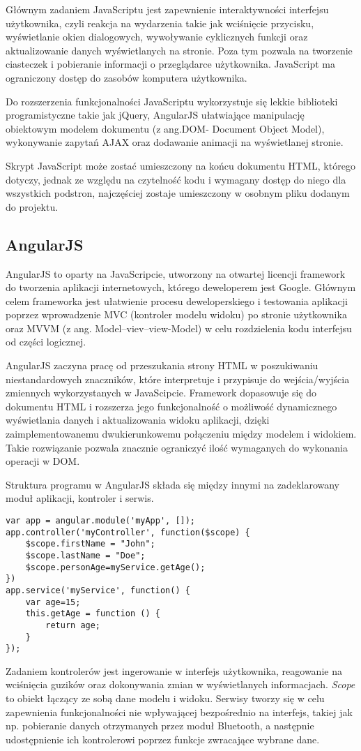 Głównym zadaniem JavaScriptu jest zapewnienie interaktywności interfejsu użytkownika, czyli reakcja na wydarzenia takie jak wciśnięcie przycisku, wyświetlanie okien dialogowych, wywoływanie cyklicznych funkcji oraz aktualizowanie danych wyświetlanych na stronie. Poza tym pozwala na tworzenie ciasteczek i pobieranie informacji o przeglądarce użytkownika. JavaScript ma ograniczony dostęp do zasobów komputera użytkownika.

Do rozszerzenia funkcjonalności JavaScriptu wykorzystuje się lekkie biblioteki programistyczne takie jak jQuery, AngularJS ułatwiające manipulację obiektowym modelem dokumentu (z ang.DOM- Document Object Model), wykonywanie zapytań AJAX oraz dodawanie animacji na wyświetlanej stronie.

Skrypt JavaScript może zostać umieszczony na końcu dokumentu HTML, którego dotyczy, jednak ze względu na czytelność kodu i wymagany dostęp do niego dla wszystkich podstron, najczęściej zostaje umieszczony w osobnym pliku dodanym do projektu.

\subsection{AngularJS}%
AngularJS to oparty na JavaScripcie, utworzony na otwartej licencji framework do tworzenia aplikacji internetowych, którego deweloperem jest Google. Głównym celem frameworka jest ułatwienie procesu deweloperskiego i testowania aplikacji poprzez wprowadzenie MVC (kontroler modelu widoku) po stronie użytkownika oraz MVVM (z ang. Model--viev--view-Model) w celu rozdzielenia kodu interfejsu od części logicznej.

AngularJS zaczyna pracę od przeszukania strony HTML w poszukiwaniu niestandardowych znaczników, które interpretuje i przypisuje do wejścia/wyjścia zmiennych wykorzystanych w JavaScipcie. Framework dopasowuje się do dokumentu HTML i rozszerza jego funkcjonalność o możliwość dynamicznego wyświetlania danych i aktualizowania widoku aplikacji, dzięki zaimplementowanemu dwukierunkowemu połączeniu między modelem i widokiem. Takie rozwiązanie pozwala znacznie ograniczyć ilość wymaganych do wykonania operacji w DOM.

Struktura programu w AngularJS składa się między innymi na zadeklarowany moduł aplikacji, kontroler i serwis.
\lstset{language=Java}
\begin{lstlisting} 
var app = angular.module('myApp', []);
app.controller('myController', function($scope) {
    $scope.firstName = "John";
    $scope.lastName = "Doe";
    $scope.personAge=myService.getAge();
})
app.service('myService', function() {
	var age=15;
    this.getAge = function () {
        return age;
    }
});
\end{lstlisting}
Zadaniem kontrolerów jest ingerowanie w interfejs użytkownika, reagowanie na wciśnięcia guzików oraz dokonywania zmian w wyświetlanych informacjach. \textit{Scope} to obiekt łączący ze sobą dane modelu i widoku. Serwisy tworzy się w celu zapewnienia funkcjonalności nie wpływającej bezpośrednio na interfejs, takiej jak np. pobieranie danych otrzymanych przez moduł Bluetooth, a następnie udostępnienie ich kontrolerowi poprzez funkcje zwracające wybrane dane.


